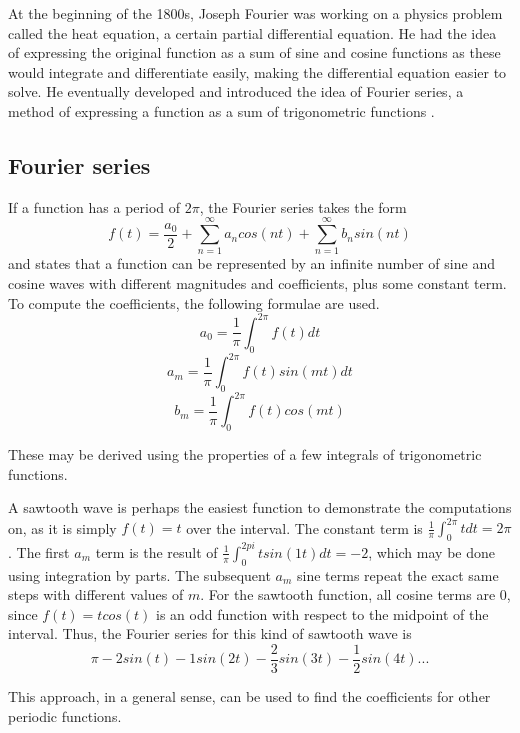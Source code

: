 At the beginning of the 1800s, Joseph Fourier was working on a physics problem called the heat equation, a certain partial differential equation. He had the idea of expressing the original function as a sum of sine and cosine functions as these would integrate and differentiate easily, making the differential equation easier to solve. He eventually developed and introduced the idea of Fourier series, a method of expressing a function as a sum of trigonometric functions \cite{Bounchaleun2019}.

\subsection{Fourier series} 
If a function has a period of $2\pi$, the Fourier series takes the form $$f(t) = \frac{a_0}{2} + \sum_{n=1}^{\infty}a_ncos(nt)+\sum_{n=1}^{\infty}b_nsin(nt)$$ and states that a function can be represented by an infinite number of sine and cosine waves with different magnitudes and coefficients, plus some constant term. To compute the coefficients, the following formulae are used.
$$a_0 = \frac{1}{\pi}\int_0^{2\pi} f(t)dt$$
$$a_m = \frac{1}{\pi}\int_0^{2\pi} f(t) sin(mt)dt$$
$$b_m = \frac{1}{\pi}\int_0^{2\pi} f(t) cos(mt)$$

These may be derived using the properties of a few integrals of trigonometric functions.

A sawtooth wave is perhaps the easiest function to demonstrate the computations on, as it is simply $f(t) = t$ over the interval. The constant term is $\frac{1}{\pi}\int_0^{2\pi} t dt = 2\pi$. The first $a_m$ term is the result of $\frac{1}{\pi}\int_0^{2pi} t sin(1t)dt = -2$, which may be done using integration by parts. The subsequent $a_m$ sine terms repeat the exact same steps with different values of $m$. For the sawtooth function, all cosine terms are 0, since $f(t)=tcos(t)$ is an odd function with respect to the midpoint of the interval. Thus, the Fourier series for this kind of sawtooth wave is
$$\pi -2sin(t) -1sin(2t)-\frac{2}{3}sin(3t) - \frac{1}{2}sin(4t) ...$$

This approach, in a general sense, can be used to find the coefficients for other periodic functions. 


